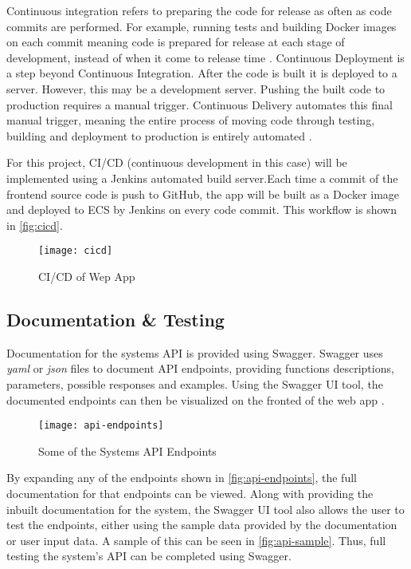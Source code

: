 	Continuous integration refers to preparing the code for release as often as code commits are performed. For example, running tests and building Docker images on each commit meaning code is prepared for release at each stage of development, instead of when it come to release time \citep{ramos}.
	Continuous Deployment is a step beyond Continuous Integration. After the code is built it is deployed to a server. However, this may be a development server. Pushing the built code to production requires a manual trigger. Continuous Delivery automates this final manual trigger, meaning the entire process of moving code through testing, building and deployment to production is entirely automated \citep{ellingwood}.
	
	For this project, CI/CD (continuous development in this case) will be implemented using a Jenkins automated build server.Each time a commit of the frontend source code is push to GitHub, the app will be built as a Docker image and deployed to ECS by Jenkins on every code commit. This workflow is shown in \autoref{fig:cicd}.
	
	\begin{figure}[H]
		\setlength{\belowcaptionskip}{15pt plus 3pt minus 2pt}
		\caption{CI/CD of Wep App}
		\centering
		\texttt{[image: cicd]}
		\label{fig:cicd}
	\end{figure}

	\subsection{Documentation \& Testing}
  Documentation for the systems API is provided using Swagger. Swagger uses \textit{yaml} or \textit{json} files to document API endpoints, providing functions descriptions, parameters, possible responses and examples. Using the Swagger UI tool, the documented endpoints can then be visualized on the fronted of the web app \citep{swagger}.
  
  \begin{figure}[H]
    \setlength{\belowcaptionskip}{15pt plus 3pt minus 2pt}
    \caption{Some of the Systems API Endpoints}
    \centering
    \texttt{[image: api-endpoints]}
    \label{fig:api-endpoints}
  \end{figure}
  
  
  By expanding any of the endpoints shown in \autoref{fig:api-endpoints}, the full documentation for that endpoints can be viewed. Along with providing the inbuilt documentation for the system, the Swagger UI tool also allows the user to test the endpoints, either using the sample data provided by the documentation or user input data. A sample of this can be seen in \autoref{fig:api-sample}. Thus, full testing the system's API can be completed using Swagger.
  
